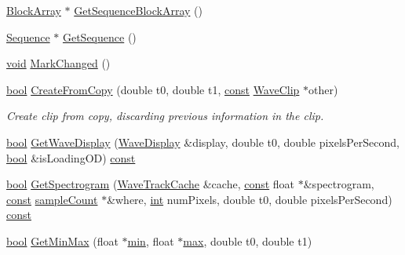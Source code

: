 \begin{DoxyCompactItemize}
\hyperlink{class_block_array}{Block\+Array} $\ast$ \hyperlink{class_wave_clip_a229b276264c7a7c1a9684cdbe6a7234c}{Get\+Sequence\+Block\+Array} ()
\item 
\hyperlink{class_sequence}{Sequence} $\ast$ \hyperlink{class_wave_clip_abd2e26af620a0406b2c45aca8736bd9a}{Get\+Sequence} ()
\item 
\hyperlink{sound_8c_ae35f5844602719cf66324f4de2a658b3}{void} \hyperlink{class_wave_clip_a272fcb9bb28b53329674c6ba14026c7b}{Mark\+Changed} ()
\item 
\hyperlink{mac_2config_2i386_2lib-src_2libsoxr_2soxr-config_8h_abb452686968e48b67397da5f97445f5b}{bool} \hyperlink{class_wave_clip_a7a72ade10b0fb3475c1511342f105fff}{Create\+From\+Copy} (double t0, double t1, \hyperlink{getopt1_8c_a2c212835823e3c54a8ab6d95c652660e}{const} \hyperlink{class_wave_clip}{Wave\+Clip} $\ast$other)
\begin{DoxyCompactList}\small\item\em Create clip from copy, discarding previous information in the clip. \end{DoxyCompactList}\item 
\hyperlink{mac_2config_2i386_2lib-src_2libsoxr_2soxr-config_8h_abb452686968e48b67397da5f97445f5b}{bool} \hyperlink{class_wave_clip_ac28044d7d312e53024f7b4fbe38e711f}{Get\+Wave\+Display} (\hyperlink{class_wave_display}{Wave\+Display} \&display, double t0, double pixels\+Per\+Second, \hyperlink{mac_2config_2i386_2lib-src_2libsoxr_2soxr-config_8h_abb452686968e48b67397da5f97445f5b}{bool} \&is\+Loading\+OD) \hyperlink{getopt1_8c_a2c212835823e3c54a8ab6d95c652660e}{const} 
\item 
\hyperlink{mac_2config_2i386_2lib-src_2libsoxr_2soxr-config_8h_abb452686968e48b67397da5f97445f5b}{bool} \hyperlink{class_wave_clip_ad59c0a252dbb49e98f74155b99777ad8}{Get\+Spectrogram} (\hyperlink{class_wave_track_cache}{Wave\+Track\+Cache} \&cache, \hyperlink{getopt1_8c_a2c212835823e3c54a8ab6d95c652660e}{const} float $\ast$\&spectrogram, \hyperlink{getopt1_8c_a2c212835823e3c54a8ab6d95c652660e}{const} \hyperlink{include_2audacity_2_types_8h_afa427e1f521ea5ec12d054e8bd4d0f71}{sample\+Count} $\ast$\&where, \hyperlink{xmltok_8h_a5a0d4a5641ce434f1d23533f2b2e6653}{int} num\+Pixels, double t0, double pixels\+Per\+Second) \hyperlink{getopt1_8c_a2c212835823e3c54a8ab6d95c652660e}{const} 
\item 
\hyperlink{mac_2config_2i386_2lib-src_2libsoxr_2soxr-config_8h_abb452686968e48b67397da5f97445f5b}{bool} \hyperlink{class_wave_clip_ac312139ebb75bc3d8f1b2431190149d4}{Get\+Min\+Max} (float $\ast$\hyperlink{_compare_audio_command_8cpp_abd8bbcfabb3ddef2ccaafb9928a37b95}{min}, float $\ast$\hyperlink{_t_d_stretch_8cpp_ac39d9cef6a5e030ba8d9e11121054268}{max}, double t0, double t1)

\end{DoxyCompactItemize}
